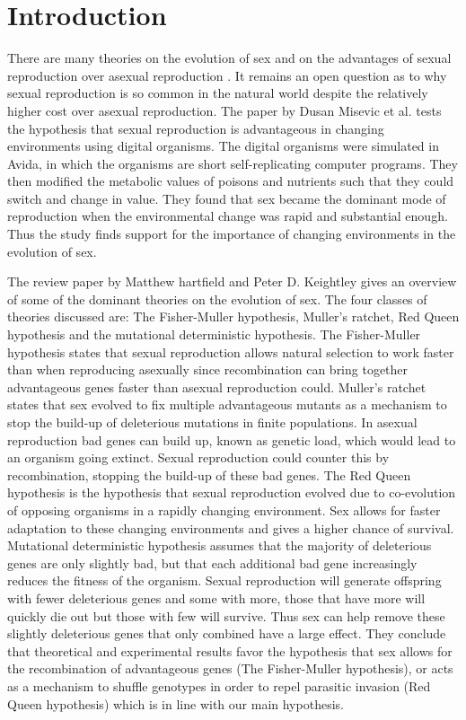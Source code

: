 \section{Introduction}

There are many theories on the evolution of sex and on the advantages of sexual reproduction over asexual reproduction \cite{misevic}. 
It remains an open question as to why sexual reproduction is so common in the natural world despite the relatively higher cost over asexual reproduction. 
The paper by Dusan Misevic et al. \cite{misevicchanging} tests the hypothesis that sexual reproduction is advantageous in changing environments using digital organisms. 
The digital organisms were simulated in Avida, in which the organisms are short self-replicating computer programs. 
They then modified the metabolic values of poisons and nutrients such that they could switch and change in value. 
They found that sex became the dominant mode of reproduction when the environmental change was rapid and substantial enough. 
Thus the study finds support for the importance of changing environments in the evolution of sex. 

The review paper by Matthew hartfield and Peter D. Keightley \cite{matthewhartfield} gives an overview of some of the dominant theories on the evolution of sex. 
The four classes of theories discussed are: The Fisher-Muller hypothesis, Muller's ratchet, Red Queen hypothesis and the mutational deterministic hypothesis.
The Fisher-Muller hypothesis states that sexual reproduction allows natural selection to work faster than when reproducing asexually since recombination can bring together advantageous genes faster than asexual reproduction could.
Muller's ratchet states that sex evolved to fix multiple advantageous mutants as a mechanism to stop the build-up of deleterious mutations in finite populations. 
In asexual reproduction bad genes can build up, known as genetic load, which would lead to an organism going extinct. 
Sexual reproduction could counter this by recombination, stopping the build-up of these bad genes.
The Red Queen hypothesis is the hypothesis that sexual reproduction evolved due to co-evolution of opposing organisms in a rapidly changing environment. 
Sex allows for faster adaptation to these changing environments and gives a higher chance of survival.
Mutational deterministic hypothesis assumes that the majority of deleterious genes are only slightly bad, but that each additional bad gene increasingly reduces the fitness of the organism. 
Sexual reproduction will generate offspring with fewer deleterious genes and some with more, those that have more will quickly die out but those with few will survive. 
Thus sex can help remove these slightly deleterious genes that only combined have a large effect.
They conclude that theoretical and experimental results favor the hypothesis that sex allows for the recombination of advantageous genes (The Fisher-Muller hypothesis), or acts as a mechanism to shuffle genotypes in order to repel parasitic invasion (Red Queen hypothesis) which is in line with our main hypothesis.

